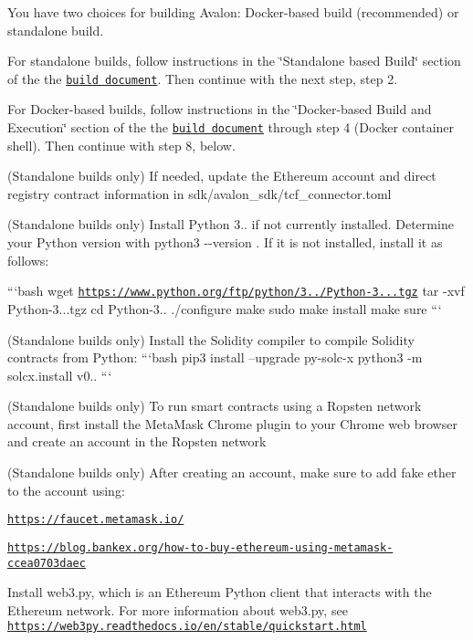 
\begin{DoxyEnumerate}
\item You have two choices for building Avalon\+: Docker-\/based build (recommended) or standalone build.
\begin{DoxyItemize}
\item For standalone builds, follow instructions in the \char`\"{}\+Standalone based Build\char`\"{} section of the the \href{../BUILD.md#standalonebuild}{\tt build document}. Then continue with the next step, step 2.
\item For Docker-\/based builds, follow instructions in the \char`\"{}\+Docker-\/based Build and Execution\char`\"{} section of the the \href{../BUILD.md#dockerbuild}{\tt build document} through step 4 (Docker container shell). Then continue with step 8, below.
\end{DoxyItemize}
\item (Standalone builds only) If needed, update the Ethereum account and direct registry contract information in {\ttfamily sdk/avalon\+\_\+sdk/tcf\+\_\+connector.\+toml}
\item (Standalone builds only) Install Python 3.. if not currently installed. Determine your Python version with {\ttfamily python3 -\/-\/version} . If it is not installed, install it as follows\+:

```bash wget \href{https://www.python.org/ftp/python/3.6.8/Python-3.6.8.tgz}{\tt https\+://www.\+python.\+org/ftp/python/3../\+Python-\/3...\+tgz} tar -\/xvf Python-\/3...\+tgz cd Python-\/3.. ./configure make sudo make install make sure ```
\item (Standalone builds only) Install the Solidity compiler to compile Solidity contracts from Python\+: ```bash pip3 install --upgrade py-\/solc-\/x python3 -\/m solcx.\+install v0.. ```
\item (Standalone builds only) To run smart contracts using a Ropsten network account, first install the Meta\+Mask Chrome plugin to your Chrome web browser and create an account in the Ropsten network
\item (Standalone builds only) After creating an account, make sure to add fake ether to the account using\+:
\begin{DoxyItemize}
\item \href{https://faucet.metamask.io/}{\tt https\+://faucet.\+metamask.\+io/}
\item \href{https://blog.bankex.org/how-to-buy-ethereum-using-metamask-ccea0703daec}{\tt https\+://blog.\+bankex.\+org/how-\/to-\/buy-\/ethereum-\/using-\/metamask-\/ccea0703daec}
\end{DoxyItemize}
\item Install web3.\+py, which is an Ethereum Python client that interacts with the Ethereum network. For more information about web3.\+py, see \href{https://web3py.readthedocs.io/en/stable/quickstart.html}{\tt https\+://web3py.\+readthedocs.\+io/en/stable/quickstart.\+html}


\end{DoxyEnumerate}
